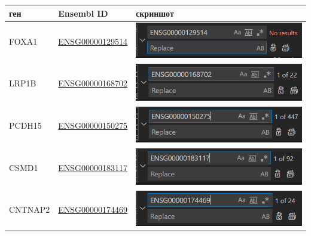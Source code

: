 \documentclass{article}
\begin{document}
  \begin{center}
    \begin{tabular}{|l|l|l|}
      \hline
      ген & Ensembl ID & скриншот \\\hline
      FOXA1 & \href{https://dcc.icgc.org/genes/ENSG00000129514}{ENSG00000129514} & \includegraphics[align=c]{ENSG00000129514.png} \\\hline
      LRP1B & \href{https://dcc.icgc.org/genes/ENSG00000168702}{ENSG00000168702} & \includegraphics[align=c]{ENSG00000168702.png} \\\hline
      PCDH15 & \href{https://dcc.icgc.org/genes/ENSG00000150275}{ENSG00000150275} & \includegraphics[align=c]{ENSG00000150275.png} \\\hline
      CSMD1 & \href{https://dcc.icgc.org/genes/ENSG00000183117}{ENSG00000183117} & \includegraphics[align=c]{ENSG00000183117.png} \\\hline
      CNTNAP2 & \href{https://dcc.icgc.org/genes/ENSG00000174469}{ENSG00000174469} & \includegraphics[align=c]{ENSG00000174469.png} \\\hline
    \end{tabular}
  \end{center}
\end{document}
